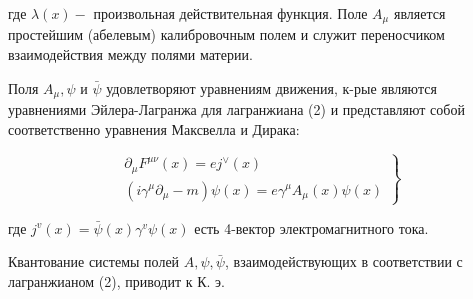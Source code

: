 \documentclass[10pt]{article}
\begin{document}
где $\lambda(x)-$ произвольная действительная функция. Поле $A_{\mu}$ является простейшим (абелевым) калибровочным полем и служит переносчиком взаимодействия между полями материи.



Поля $A_{\mu}, \psi$ и $\bar{\psi}$ удовлетворяют уравнениям движения, к-рые являются уравнениями Эйлера-Лагранжа для лагранжиана (2) и представляют собой соответственно уравнения Максвелла и Дирака:



\[

\left.\begin{array}{c}

\partial_{\mu} F^{\mu \nu}(x)=e j^{\vee}(x) \\

\left(i \gamma^{\mu} \partial_{\mu}-m\right) \psi(x)=e \gamma^{\mu} A_{\mu}(x) \psi(x)

\end{array}\right\}

\]



где $j^{v}(x)=\bar{\psi}(x) \gamma^{v} \psi(x)$ есть 4-вектор электромагнитного тока.



Квантование системы полей $A, \psi, \bar{\psi}$, взаимодействующих в соответствии с лагранжианом (2), приводит к К. э.
\end{document}
